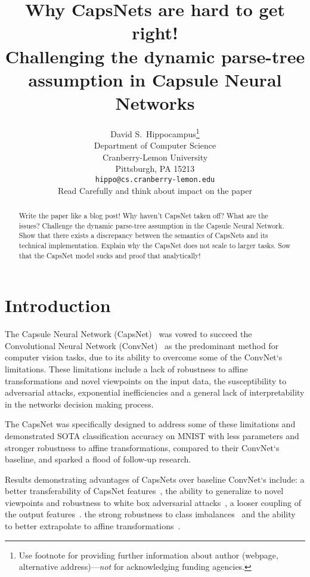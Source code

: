 \documentclass{article}
\title{                                                                                                                                          
	Why CapsNets are hard to get right! \\
	\vspace{0.5cm}
	\large
	Challenging  the dynamic parse-tree assumption  in Capsule Neural Networks
}
\author{%
  David S.~Hippocampus\thanks{Use footnote for providing further information
    about author (webpage, alternative address)---\emph{not} for acknowledging
    funding agencies.} \\
  Department of Computer Science\\
  Cranberry-Lemon University\\
  Pittsburgh, PA 15213 \\
  \texttt{hippo@cs.cranberry-lemon.edu} \\Read Carefully and think about impact on the paper
}
\begin{document}
\maketitle

\begin{abstract}
  Write the paper like a blog post!
  Why haven't CapsNet taken off?
  What are the issues?
  Challenge the dynamic parse-tree assumption in the Capsule Neural Network.
  Show that there exists a discrepancy between the semantics of CapsNets and its technical implementation.
  Explain why the CapsNet does not scale to larger tasks.
  Sow that the CapsNet model sucks and proof that analytically!
\end{abstract}

\begin{comment}
	TODO
	- Rework results
	- Reread the CapsNet paper
	- Think about motivation for parse trees, then motivate experiements accordingly
	- Add better less exhaustive introduction
	- Rework related work
	
	IDEA:
	- Title in parse-tree form
\end{comment}

\section{Introduction}

The Capsule Neural Network (CapsNet)~\cite{nips/SabourFH17} was vowed to succeed the Convolutional Neural Network (ConvNet)~\cite{neco/LeCunBDHHHJ89} as the predominant method for computer vision tasks, due to its ability to overcome some of the ConvNet`s limitations. %
These limitations include
a lack of robustness to affine transformations and novel viewpoints on the input data, 
the susceptibility to adversarial attacks,
exponential inefficiencies
and a general lack of interpretability in the networks decision making process. %

The CapsNet was specifically designed to address some of these limitations and demonstrated SOTA classification accuracy on MNIST with less parameters and stronger robustness to affine transformations, compared to their ConvNet`s baseline, and sparked a flood of follow-up research.

Results demonstrating advantages of CapsNets over baseline ConvNet`s include:
a better transferability of CapsNet features~\cite{corr/Ancheng2018},
the ability to generalize to novel viewpoints and robustness to white box adversarial attacks~\cite{iclr/HintonSF18},
a looser coupling of the output features~\cite{corr/Lin2018}.
the strong robustness to class imbalances~\cite{miccai/Jimenez-Sanchez18} and
the ability to better extrapolate to affine transformations~\cite{cvpr/GuT20}.
\end{document}
